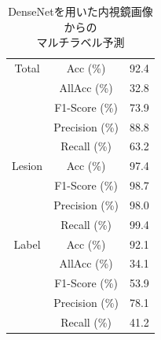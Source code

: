 \begin{table}[tb]
    \caption[]{DenseNetを用いた内視鏡画像からの\\マルチラベル予測}
    \label{tb:0}
    \centering
    \normalsize
    \begin{tabular}{c|c|r} \hline
        Total & Acc (\%) & 92.4 \\ \cline{2-3}
         & AllAcc (\%) & 32.8 \\ \cline{2-3}
         & F1-Score (\%) & 73.9 \\ \cline{2-3}
         & Precision (\%) & 88.8 \\ \cline{2-3}
         & Recall (\%) & 63.2 \\ \hline
        Lesion & Acc (\%) & 97.4 \\ \cline{2-3}
         & F1-Score (\%) & 98.7 \\ \cline{2-3}
         & Precision (\%) & 98.0 \\ \cline{2-3}
         & Recall (\%) & 99.4 \\ \hline
        Label & Acc (\%) & 92.1 \\ \cline{2-3}
         & AllAcc (\%) & 34.1 \\ \cline{2-3}
         & F1-Score (\%) & 53.9 \\ \cline{2-3}
         & Precision (\%) & 78.1 \\ \cline{2-3}
         & Recall (\%) & 41.2 \\ \hline
    \end{tabular}
\end{table}
